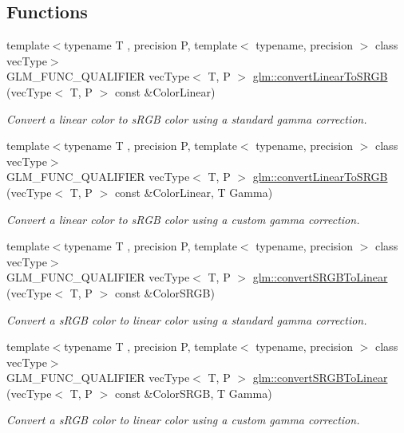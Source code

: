 \subsection*{Functions}
\begin{DoxyCompactItemize}
\item 
{\footnotesize template$<$typename T , precision P, template$<$ typename, precision $>$ class vec\+Type$>$ }\\G\+L\+M\+\_\+\+F\+U\+N\+C\+\_\+\+Q\+U\+A\+L\+I\+F\+I\+E\+R vec\+Type$<$ T, P $>$ \hyperlink{group__gtc__color__space_gad813dcd99644cafc775e83d6504ccb93}{glm\+::convert\+Linear\+To\+S\+R\+G\+B} (vec\+Type$<$ T, P $>$ const \&Color\+Linear)
\begin{DoxyCompactList}\small\item\em Convert a linear color to s\+R\+G\+B color using a standard gamma correction. \end{DoxyCompactList}\item 
{\footnotesize template$<$typename T , precision P, template$<$ typename, precision $>$ class vec\+Type$>$ }\\G\+L\+M\+\_\+\+F\+U\+N\+C\+\_\+\+Q\+U\+A\+L\+I\+F\+I\+E\+R vec\+Type$<$ T, P $>$ \hyperlink{group__gtc__color__space_ga63f8b003da7acf44370eb47bfb8b3d42}{glm\+::convert\+Linear\+To\+S\+R\+G\+B} (vec\+Type$<$ T, P $>$ const \&Color\+Linear, T Gamma)
\begin{DoxyCompactList}\small\item\em Convert a linear color to s\+R\+G\+B color using a custom gamma correction. \end{DoxyCompactList}\item 
{\footnotesize template$<$typename T , precision P, template$<$ typename, precision $>$ class vec\+Type$>$ }\\G\+L\+M\+\_\+\+F\+U\+N\+C\+\_\+\+Q\+U\+A\+L\+I\+F\+I\+E\+R vec\+Type$<$ T, P $>$ \hyperlink{group__gtc__color__space_ga28e98e64347cf385cadc1ceb4def55c9}{glm\+::convert\+S\+R\+G\+B\+To\+Linear} (vec\+Type$<$ T, P $>$ const \&Color\+S\+R\+G\+B)
\begin{DoxyCompactList}\small\item\em Convert a s\+R\+G\+B color to linear color using a standard gamma correction. \end{DoxyCompactList}\item 
{\footnotesize template$<$typename T , precision P, template$<$ typename, precision $>$ class vec\+Type$>$ }\\G\+L\+M\+\_\+\+F\+U\+N\+C\+\_\+\+Q\+U\+A\+L\+I\+F\+I\+E\+R vec\+Type$<$ T, P $>$ \hyperlink{group__gtc__color__space_ga61c4f0efdf55c29d9cfbd26141fddef8}{glm\+::convert\+S\+R\+G\+B\+To\+Linear} (vec\+Type$<$ T, P $>$ const \&Color\+S\+R\+G\+B, T Gamma)
\begin{DoxyCompactList}\small\item\em Convert a s\+R\+G\+B color to linear color using a custom gamma correction. \end{DoxyCompactList}\end{DoxyCompactItemize}


